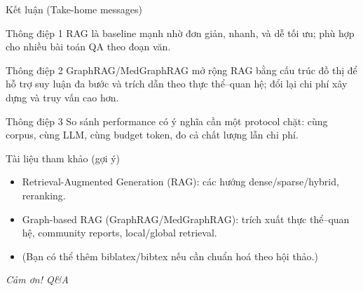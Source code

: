 \documentclass[aspectratio=169,10pt]{beamer}
\begin{document}
\begin{frame}{Kết luận (Take-home messages)}
\small
\begin{block}{Thông điệp 1}
RAG là baseline mạnh nhờ đơn giản, nhanh, và dễ tối ưu; phù hợp cho nhiều bài toán QA theo đoạn văn.
\end{block}

\begin{block}{Thông điệp 2}
GraphRAG/MedGraphRAG mở rộng RAG bằng cấu trúc đồ thị để hỗ trợ suy luận đa bước và trích dẫn theo thực thể--quan hệ; đổi lại chi phí xây dựng và truy vấn cao hơn.
\end{block}

\begin{block}{Thông điệp 3}
So sánh performance có ý nghĩa cần một protocol chặt: cùng corpus, cùng LLM, cùng budget token, đo cả chất lượng lẫn chi phí.
\end{block}
\end{frame}

\begin{frame}{Tài liệu tham khảo (gợi ý)}
\small
\begin{itemize}
  \item Retrieval-Augmented Generation (RAG): các hướng dense/sparse/hybrid, reranking.
  \item Graph-based RAG (GraphRAG/MedGraphRAG): trích xuất thực thể--quan hệ, community reports, local/global retrieval.
  \item (Bạn có thể thêm biblatex/bibtex nếu cần chuẩn hoá theo hội thảo.)
\end{itemize}

\vspace{0.2cm}
\begin{center}
\textit{Cảm ơn! Q\&A}
\end{center}
\end{frame}
\end{document}
